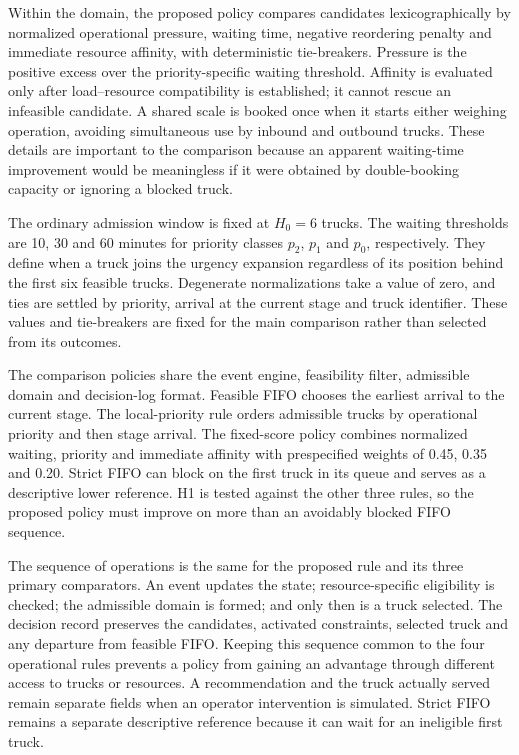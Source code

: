 \documentclass[12pt,a4paper]{article}
\begin{document}
Within the domain, the proposed policy compares candidates lexicographically by normalized operational pressure, waiting time, negative reordering penalty and immediate resource affinity, with deterministic tie-breakers. Pressure is the positive excess over the priority-specific waiting threshold. Affinity is evaluated only after load–resource compatibility is established; it cannot rescue an infeasible candidate. A shared scale is booked once when it starts either weighing operation, avoiding simultaneous use by inbound and outbound trucks. These details are important to the comparison because an apparent waiting-time improvement would be meaningless if it were obtained by double-booking capacity or ignoring a blocked truck.

The ordinary admission window is fixed at $H_0=6$ trucks. The waiting thresholds are 10, 30 and 60 minutes for priority classes $p_2$, $p_1$ and $p_0$, respectively. They define when a truck joins the urgency expansion regardless of its position behind the first six feasible trucks. Degenerate normalizations take a value of zero, and ties are settled by priority, arrival at the current stage and truck identifier. These values and tie-breakers are fixed for the main comparison rather than selected from its outcomes.

The comparison policies share the event engine, feasibility filter, admissible domain and decision-log format. Feasible FIFO chooses the earliest arrival to the current stage. The local-priority rule orders admissible trucks by operational priority and then stage arrival. The fixed-score policy combines normalized waiting, priority and immediate affinity with prespecified weights of 0.45, 0.35 and 0.20. Strict FIFO can block on the first truck in its queue and serves as a descriptive lower reference. H1 is tested against the other three rules, so the proposed policy must improve on more than an avoidably blocked FIFO sequence.

The sequence of operations is the same for the proposed rule and its three primary comparators. An event updates the state; resource-specific eligibility is checked; the admissible domain is formed; and only then is a truck selected. The decision record preserves the candidates, activated constraints, selected truck and any departure from feasible FIFO. Keeping this sequence common to the four operational rules prevents a policy from gaining an advantage through different access to trucks or resources. A recommendation and the truck actually served remain separate fields when an operator intervention is simulated. Strict FIFO remains a separate descriptive reference because it can wait for an ineligible first truck.
\end{document}
